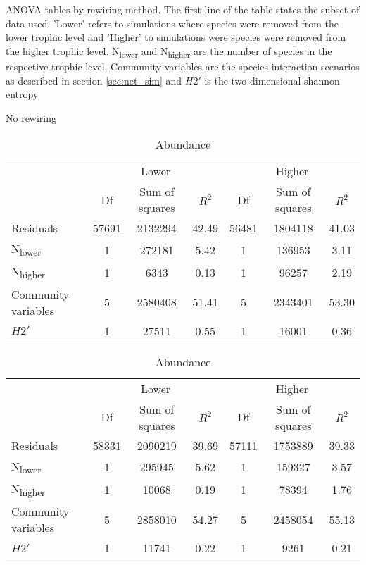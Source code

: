 \documentclass[12pt,a4paper]{article}
\begin{document}
\begin{table}[H]
\label{tab:anova_by_rew}
\caption{ANOVA tables by rewiring method. The first line of the table states the subset of data used. 'Lower' refers to simulations where species were removed from the lower trophic level and 'Higher' to simulations were species were removed from the higher trophic level. N\textsubscript{lower} and N\textsubscript{higher} are the number of species in the respective trophic level, Community variables are the species interaction scenarios as described in section \ref{sec:net_sim} and $H2'$ is the two dimensional shannon entropy \parencite{Bluethgen2006}}
    \begin{subtable}{\linewidth}
    \caption{No rewiring}
    \centering
\begin{tabularx}{\linewidth}{@{} X *6{c} @{}}
\toprule
      & \multicolumn{3}{c}{Lower} & \multicolumn{3}{c}{Higher} \\ \cmidrule(l){2-4} \cmidrule(l){5-7}
  						& Df		& Sum of squares	& $R^2$	& Df 	& Sum of squares	& $R^2$ \\ \midrule
Residuals 				& 57691 & 2132294		& 42.49	& 56481 & 1804118 		& 41.03   \\
N\textsubscript{lower} 	& 1 		& 272181			&  5.42	& 1		& 136953			& 3.11  \\
N\textsubscript{higher} 	& 1 		& 6343			& 0.13	& 1 		& 96257 			& 2.19  \\
Community variables 		& 5 		& 2580408 		& 51.41	& 5 		& 2343401			& 53.30  \\
$H2'$ 					& 1 		& 27511			& 0.55 	& 1 		& 16001		& 0.36 \\ \bottomrule
\end{tabularx}
 \end{subtable}

 \medskip
\begin{subtable}{\linewidth}
\caption{Abundance}
    \centering
\begin{tabularx}{\linewidth}{@{} X *6{c} @{}}
\toprule
  & \multicolumn{3}{c}{Lower} & \multicolumn{3}{c}{Higher} \\ \cmidrule(l){2-4} \cmidrule(l){5-7}
  						& Df		& Sum of squares	& $R^2$	& Df 	& Sum of squares	& $R^2$ \\ \midrule
Residuals 				& 58331 & 2090219		& 39.69	& 57111 & 1753889 		& 39.33   \\
N\textsubscript{lower} 	& 1 		& 295945 		& 5.62 	& 1		& 159327 			& 3.57  \\
N\textsubscript{higher} 	& 1 		& 10068 			& 0.19	& 1 		& 78394 			& 1.76  \\
Community variables		& 5 		& 2858010 		& 54.27 	& 5 		& 2458054			& 55.13  \\
$H2'$ 					& 1 		& 11741 			& 0.22 	& 1 		& 9261			& 0.21 \\ \bottomrule
\end{tabularx}
\end{subtable}


\end{table}
\end{document}
